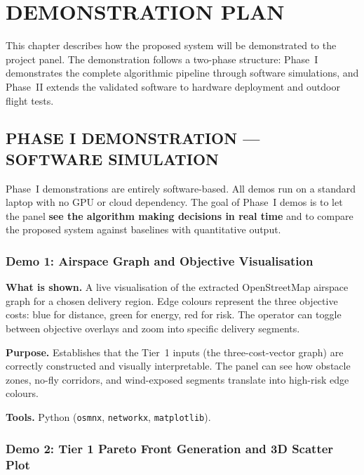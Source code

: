 
\chapter{DEMONSTRATION PLAN}

This chapter describes how the proposed system will be demonstrated to the project panel.
The demonstration follows a two-phase structure: Phase~I demonstrates the complete
algorithmic pipeline through software simulations, and Phase~II
extends the validated software to hardware deployment and outdoor flight tests.

\section{PHASE I DEMONSTRATION --- SOFTWARE SIMULATION}

Phase~I demonstrations are entirely software-based. All demos run on a standard laptop
with no GPU or cloud dependency. The goal of Phase~I demos is to let the panel
\textbf{see the algorithm making decisions in real time} and to compare the proposed
system against baselines with quantitative output.

\subsection{Demo 1: Airspace Graph and Objective Visualisation}

\textbf{What is shown.} A live visualisation of the extracted OpenStreetMap airspace
graph for a chosen delivery region. Edge colours represent the three objective costs:
blue for distance, green for energy, red for risk. The operator can toggle between
objective overlays and zoom into specific delivery segments.

\textbf{Purpose.} Establishes that the Tier~1 inputs (the three-cost-vector graph) are
correctly constructed and visually interpretable. The panel can see how obstacle zones,
no-fly corridors, and wind-exposed segments translate into high-risk edge colours.

\textbf{Tools.} Python (\texttt{osmnx}, \texttt{networkx}, \texttt{matplotlib}).

\subsection{Demo 2: Tier 1 Pareto Front Generation and 3D Scatter Plot}

